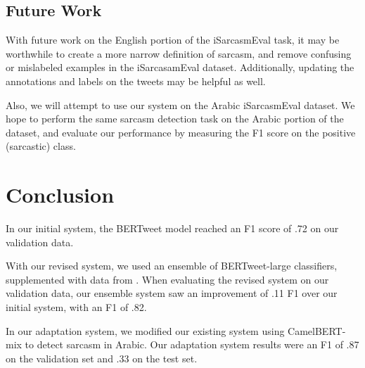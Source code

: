 \documentclass[11pt]{article}
\begin{document}
\subsection{Future Work}

With future work on the English portion of the iSarcasmEval task, it may be worthwhile to create a more narrow definition of sarcasm, and remove confusing or mislabeled examples in the iSarcasamEval dataset. Additionally, updating the annotations and labels on the tweets may be helpful as well.

Also, we will attempt to use our system on the Arabic iSarcasmEval dataset. We hope to perform the same sarcasm detection task on the Arabic portion of the dataset, and evaluate our performance by measuring the F1 score on the positive (sarcastic) class.

\section{Conclusion}

In our initial system, the BERTweet model reached an F1 score of .72 on our validation data. 

With our revised system, we used an ensemble of BERTweet-large classifiers, supplemented with data from \citealp{Ptcek2014SarcasmDO}. When evaluating the revised system on our validation data, our ensemble system saw an improvement of .11 F1 over our initial system, with an F1 of .82.

In our adaptation system, we modified our existing system using CamelBERT-mix to detect sarcasm in Arabic. Our adaptation system results were an F1 of .87 on the validation set and .33 on the test set.




\appendix
\end{document}
